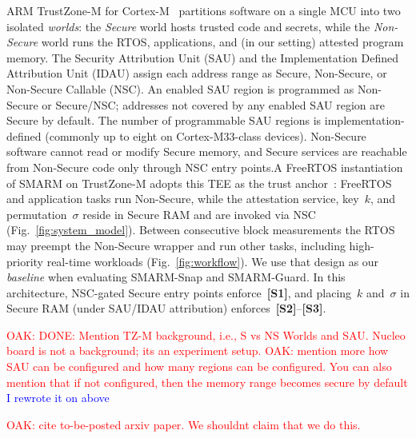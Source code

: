 \documentclass[conference]{IEEEtran}
\newcommand{\smarmcopy}{SMARM-Snap\xspace}
\newcommand{\smarmlock}{SMARM-Guard\xspace}
\newcommand\oak[1]{\textcolor{red}{OAK: #1}}
\newcommand\ben[1]{\textcolor{blue}{#1}}
\begin{document}
ARM TrustZone-M for Cortex-M~\cite{trustzone2025,an5347} partitions software on a
single MCU into two isolated \emph{worlds}: the \emph{Secure} world hosts trusted
code and secrets, while the \emph{Non-Secure} world runs the RTOS, applications,
and (in our setting) attested program memory.
The Security Attribution Unit (SAU) and the Implementation Defined Attribution Unit
(IDAU) assign each address range as Secure, Non-Secure, or Non-Secure Callable (NSC).
An enabled SAU region is programmed as Non-Secure or Secure/NSC; addresses not covered
by any enabled SAU region are Secure by default.
The number of programmable SAU regions is implementation-defined (commonly up to
eight on Cortex-M33-class devices).
Non-Secure software cannot read or modify Secure memory, and Secure services are
reachable from Non-Secure code only through NSC entry points.A FreeRTOS instantiation of SMARM on TrustZone-M adopts this TEE as the trust
anchor~\cite{smarmplus2026}: FreeRTOS and application tasks run Non-Secure, while
the attestation service, key~$k$, and permutation~$\sigma$ reside in Secure RAM and
are invoked via NSC (Fig.~\ref{fig:system_model}).
Between consecutive block measurements the RTOS may preempt the Non-Secure wrapper
and run other tasks, including high-priority real-time workloads
(Fig.~\ref{fig:workflow}).
We use that design as our \emph{baseline} when evaluating \smarmcopy{} and
\smarmlock{}.
In this architecture, NSC-gated Secure entry points enforce~\textbf{[S1]}, and
placing~$k$ and~$\sigma$ in Secure RAM (under SAU/IDAU attribution)
enforces~\textbf{[S2]}--\textbf{[S3]}.


\oak{DONE: Mention TZ-M background, i.e., S vs NS Worlds and SAU. Nucleo board is not a background; its an experiment setup.}
\oak{mention more how SAU can be configured and how many regions can be configured. You can also mention that if not configured, then the memory range becomes secure by default}
\ben{I rewrote it on above }

\oak{cite to-be-posted arxiv paper. We shouldnt claim that we do this.}
\end{document}
